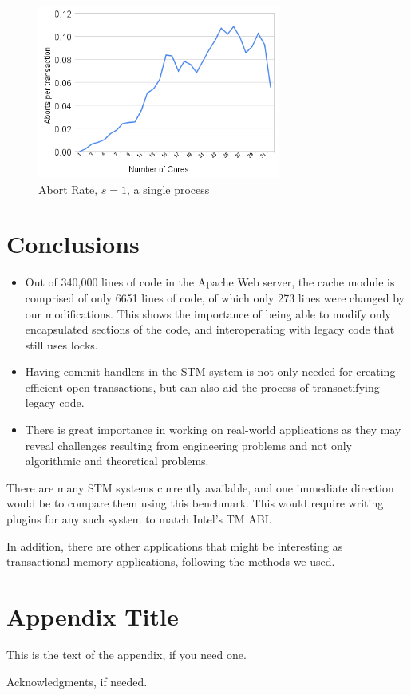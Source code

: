 \documentclass[preprint,natbib,11pt]{sigplanconf}
\begin{document}
\begin{figure}
 \begin{center}
  \includegraphics[width=8cm]{abort-rate.png}
 \end{center}
 \caption{Abort Rate, $s = 1$, a single process}
 \label{fig:abort-rate}
\end{figure}

\section{Conclusions}
\begin{itemize}
  \item Out of 340,000 lines of code in the Apache Web server, the cache module is comprised of only 6651 lines of code, of which only 273 lines were changed by our modifications. This shows the importance of being able to modify only encapsulated sections of the code, and interoperating with legacy code that still uses locks.  
  \item Having commit handlers in the STM system is not only needed for creating efficient open transactions, but can also aid the process of transactifying legacy code.
  \item There is great importance in working on real-world applications as they may reveal challenges resulting from engineering problems and not only algorithmic and theoretical problems.
\end{itemize}
There are many STM systems currently available, and one immediate direction would be to compare them using this benchmark. This would require writing plugins for any such system to match Intel's TM ABI. 

In addition, there are other applications that might be interesting as transactional memory applications, following the methods we used.

\appendix
\section{Appendix Title}

This is the text of the appendix, if you need one.

\acks

Acknowledgments, if needed.



%
%


\end{document}
